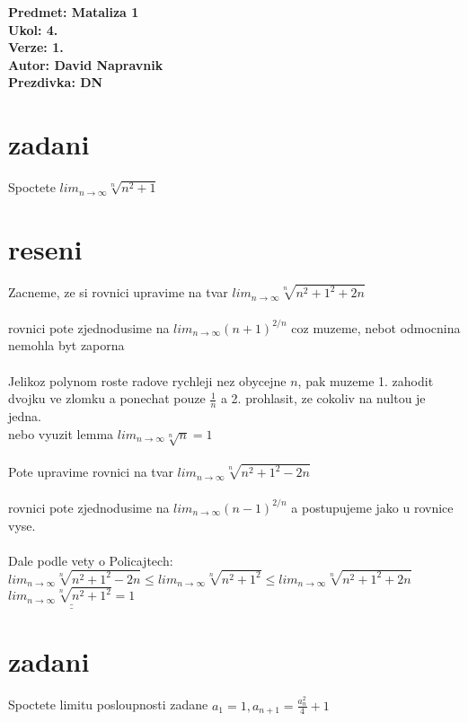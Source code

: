 \documentclass[a4paper]{article}
\def\doubleunderline#1{\underline{\underline{#1}}}
\begin{document}
\noindent
\textbf{Predmet: Mataliza 1}\\
\textbf{Ukol: 4.}\\
\textbf{Verze: 1.}\\
\textbf{Autor: David Napravnik}\\
\textbf{Prezdivka: DN}

\section*{zadani}
Spoctete $lim_{n \rightarrow \infty} \sqrt[n]{n^2 + 1}$


\section*{reseni}
Zacneme, ze si rovnici upravime na tvar 
$lim_{n \rightarrow \infty} \sqrt[n]{n^2 + 1^2 + 2n}$\\\\
rovnici pote zjednodusime na
$lim_{n \rightarrow \infty} (n + 1)^{2/n}$
coz muzeme, nebot odmocnina nemohla byt zaporna\\\\
Jelikoz polynom roste radove rychleji nez obycejne $n$,
pak muzeme 1. zahodit dvojku ve zlomku a ponechat pouze
$\frac{1}{n}$ a 2. prohlasit, ze cokoliv na nultou je jedna.\\
nebo vyuzit lemma $lim_{n \rightarrow \infty} \sqrt[n]{n}=1$\\\\
Pote upravime rovnici na tvar
$lim_{n \rightarrow \infty} \sqrt[n]{n^2 + 1^2 - 2n}$\\\\
rovnici pote zjednodusime na
$lim_{n \rightarrow \infty} (n - 1)^{2/n}$
a postupujeme jako u rovnice vyse.\\\\
Dale podle vety o Policajtech:\\
$lim_{n \rightarrow \infty} \sqrt[n]{n^2 + 1^2 - 2n} \leq
lim_{n \rightarrow \infty} \sqrt[n]{n^2 + 1^2} \leq
lim_{n \rightarrow \infty} \sqrt[n]{n^2 + 1^2 + 2n}$\\
$\doubleunderline{lim_{n \rightarrow \infty} \sqrt[n]{n^2 + 1^2} = 1}$





\section*{zadani}
Spoctete limitu posloupnosti zadane 
$a_1 = 1, a_{n+1} = \frac{a^2_n}{4} + 1$
\end{document}
